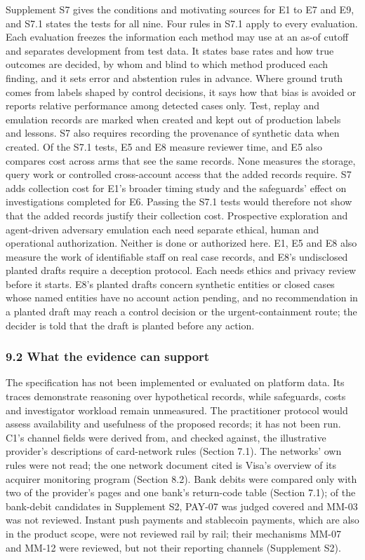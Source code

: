 \documentclass[
  11pt,
]{article}
\begin{document}
Supplement S7 gives the conditions and motivating sources for E1 to E7
and E9, and S7.1 states the tests for all nine. Four rules in S7.1 apply
to every evaluation. Each evaluation freezes the information each method
may use at an as-of cutoff and separates development from test data. It
states base rates and how true outcomes are decided, by whom and blind
to which method produced each finding, and it sets error and abstention
rules in advance. Where ground truth comes from labels shaped by control
decisions, it says how that bias is avoided or reports relative
performance among detected cases only. Test, replay and emulation
records are marked when created and kept out of production labels and
lessons. S7 also requires recording the provenance of synthetic data
when created. Of the S7.1 tests, E5 and E8 measure reviewer time, and E5
also compares cost across arms that see the same records. None measures
the storage, query work or controlled cross-account access that the
added records require. S7 adds collection cost for E1's broader timing
study and the safeguards' effect on investigations completed for E6.
Passing the S7.1 tests would therefore not show that the added records
justify their collection cost. Prospective exploration and agent-driven
adversary emulation each need separate ethical, human and operational
authorization. Neither is done or authorized here. E1, E5 and E8 also
measure the work of identifiable staff on real case records, and E8's
undisclosed planted drafts require a deception protocol. Each needs
ethics and privacy review before it starts. E8's planted drafts concern
synthetic entities or closed cases whose named entities have no account
action pending, and no recommendation in a planted draft may reach a
control decision or the urgent-containment route; the decider is told
that the draft is planted before any action.

\hypertarget{what-the-evidence-can-support}{%
\subsubsection{9.2 What the evidence can
support}\label{what-the-evidence-can-support}}

The specification has not been implemented or evaluated on platform
data. Its traces demonstrate reasoning over hypothetical records, while
safeguards, costs and investigator workload remain unmeasured. The
practitioner protocol would assess availability and usefulness of the
proposed records; it has not been run. C1's channel fields were derived
from, and checked against, the illustrative provider's descriptions of
card-network rules (Section 7.1). The networks' own rules were not read;
the one network document cited is Visa's overview of its acquirer
monitoring program (Section 8.2). Bank debits were compared only with
two of the provider's pages and one bank's return-code table (Section
7.1); of the bank-debit candidates in Supplement S2, \mbox{PAY-07} was
judged covered and \mbox{MM-03} was not reviewed. Instant push payments
and stablecoin payments, which are also in the product scope, were not
reviewed rail by rail; their mechanisms \mbox{MM-07} and \mbox{MM-12}
were reviewed, but not their reporting channels (Supplement S2).
\end{document}
